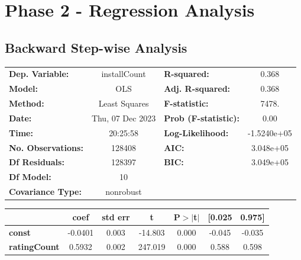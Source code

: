 \section{Phase 2 - Regression Analysis}

\subsection{Backward Step-wise Analysis}


\begin{center}
\begin{table}
\small
\begin{tabular}{lclc}
\toprule
\textbf{Dep. Variable:}    &   installCount   & \textbf{  R-squared:         } &      0.368   \\
\textbf{Model:}            &       OLS        & \textbf{  Adj. R-squared:    } &      0.368   \\
\textbf{Method:}           &  Least Squares   & \textbf{  F-statistic:       } &      7478.   \\
\textbf{Date:}             & Thu, 07 Dec 2023 & \textbf{  Prob (F-statistic):} &      0.00    \\
\textbf{Time:}             &     20:25:58     & \textbf{  Log-Likelihood:    } & -1.5240e+05  \\
\textbf{No. Observations:} &      128408      & \textbf{  AIC:               } &  3.048e+05   \\
\textbf{Df Residuals:}     &      128397      & \textbf{  BIC:               } &  3.049e+05   \\
\textbf{Df Model:}         &          10      & \textbf{                     } &              \\
\textbf{Covariance Type:}  &    nonrobust     & \textbf{                     } &              \\
\bottomrule
\end{tabular}
\begin{tabular}{lcccccc}
\toprule
                                & \textbf{coef} & \textbf{std err} & \textbf{t} & \textbf{P$> |$t$|$} & \textbf{[0.025} & \textbf{0.975]}  \\
\midrule
\textbf{const}                  &      -0.0401  &        0.003     &   -14.803  &         0.000        &       -0.045    &       -0.035     \\
\textbf{ratingCount}            &       0.5932  &        0.002     &   247.019  &         0.000        &        0.588    &        0.598     \\

\end{tabular}
\end{table}
\end{center}
